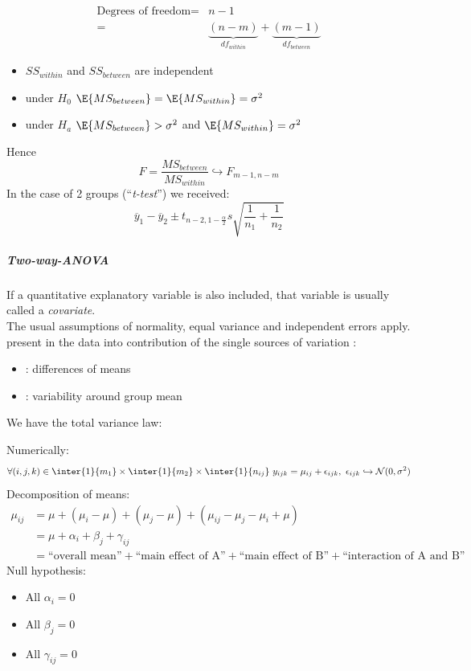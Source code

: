 \begin{align*}
	\text{Degrees of freedom} =& n - 1\\
	=& \underbrace{(n-m)}_{df_{within}} + \underbrace{(m-1)}_{df_{between}}
\end{align*}
\begin{itemize}
	\item $SS_{within}$ and $SS_{between}$ are independent
	\item under $H_{0}$ $\E{MS_{between}} = \E{MS_{within}} = \sigma^{2}$
	\item under $H_{a}$ $\E{MS_{between}}>\sigma^{2}$ and $\E{MS_{within}} = \sigma^{2}$
\end{itemize}
Hence $$ F= \dfrac{MS_{between}}{MS_{within}}\hookrightarrow F_{m-1,n-m}$$
In the case of 2 groups (``\emph{t-test}'') we received:
$$ \overline{y}_{1}-\overline{y}_{2} \pm t_{n-2,1-\frac{\alpha}{2}}s\sqrt{\frac{1}{n_{1}}+
\frac{1}{n_{2}}}$$
\subparagraph{Two-way-ANOVA}
If a quantitative explanatory variable is also included, that variable is usually called a 
\emph{covariate}.\\
The usual assumptions of normality, equal variance and independent errors apply.\\

 present in the data into contribution of the single 
sources of variation :
\begin{itemize}
	\item {}: differences of means
	\item {}: variability around group mean
\end{itemize}
We have the total variance law:
\begin{center}
\end{center}

Numerically:
$$\forall (i,j,k)\in\inter{1}{m_{1}}\times\inter{1}{m_{2}}\times\inter{1}{n_{ij}}~y_{ijk} =
\mu_{ij} +\epsilon_{ijk},~\epsilon_{ijk}\hookrightarrow \mathcal{N}(0,\sigma^{2})$$
Decomposition of means:
\begin{align*}
	\mu_{ij} &= \mu + (\mu_{i}-\mu) + (\mu_{j}-\mu) + (\mu_{ij}-\mu_{j}-\mu_{i}+\mu)\\
	&= \mu +\alpha_{i} +\beta_{j} + \gamma_{ij}\\
	&= \text{``overall mean''} + \text{``main effect of A''} + \text{``main effect of B''} +
	\text{``interaction of A and B''}
\end{align*}
Null hypothesis:
\begin{itemize}
	\item All $\alpha_{i}=0$
	\item All $\beta_{j}=0$
	\item All $\gamma_{ij}=0$
\end{itemize}

